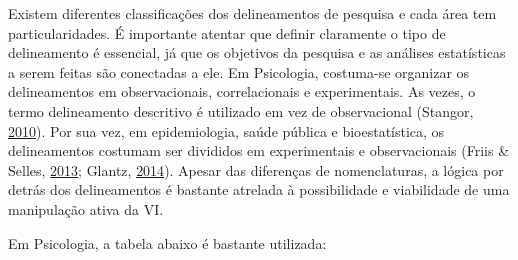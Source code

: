 \documentclass[
]{book}
\begin{document}
Existem diferentes classificações dos delineamentos de pesquisa e cada
área tem particularidades. É importante atentar que definir claramente o
tipo de delineamento é essencial, já que os objetivos da pesquisa e as
análises estatísticas a serem feitas são conectadas a ele. Em
Psicologia, costuma-se organizar os delineamentos em observacionais,
correlacionais e experimentais. As vezes, o termo delineamento
descritivo é utilizado em vez de observacional (Stangor,
\protect\hyperlink{ref-stangor2010}{2010}). Por sua vez, em
epidemiologia, saúde pública e bioestatística, os delineamentos costumam
ser divididos em experimentais e observacionais (Friis \& Selles,
\protect\hyperlink{ref-friis2013}{2013}; Glantz,
\protect\hyperlink{ref-glantz2014}{2014}). Apesar das diferenças de
nomenclaturas, a lógica por detrás dos delineamentos é bastante atrelada
à possibilidade e viabilidade de uma manipulação ativa da VI.

Em Psicologia, a tabela abaixo é bastante utilizada:
\end{document}
